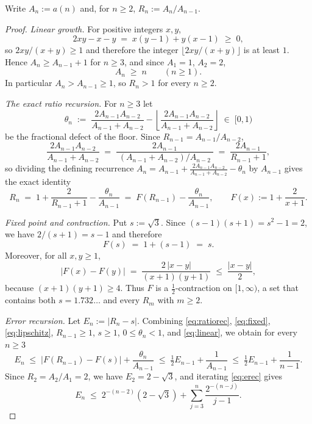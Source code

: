 \documentclass[11pt]{article}
\theoremstyle{plain}
\theoremstyle{definition}
\theoremstyle{remark}
\numberwithin{equation}{section}
\begin{document}
Write $A_n := a(n)$ and, for $n \ge 2$, $R_n := A_n/A_{n-1}$.

\begin{proof}
\emph{Linear growth.} For positive integers $x, y$,
\[
  2xy - x - y \;=\; x(y-1) + y(x-1) \;\ge\; 0,
\]
so $2xy/(x+y) \ge 1$ and therefore the integer $\lfloor 2xy/(x+y) \rfloor$ is at least $1$.
Hence $A_n \ge A_{n-1} + 1$ for $n \ge 3$, and since $A_1 = 1$, $A_2 = 2$,
\begin{equation}
  A_n \;\ge\; n \qquad (n \ge 1).
  \label{eq:linear}
\end{equation}
In particular $A_n > A_{n-1} \ge 1$, so $R_n > 1$ for every $n \ge 2$.

\emph{The exact ratio recursion.} For $n \ge 3$ let
\[
  \theta_n \;:=\; \frac{2A_{n-1}A_{n-2}}{A_{n-1}+A_{n-2}}
    - \left\lfloor \frac{2A_{n-1}A_{n-2}}{A_{n-1}+A_{n-2}} \right\rfloor \;\in\; [0,1)
\]
be the fractional defect of the floor. Since $R_{n-1} = A_{n-1}/A_{n-2}$,
\[
  \frac{2A_{n-1}A_{n-2}}{A_{n-1}+A_{n-2}}
  \;=\; \frac{2A_{n-1}}{\;(A_{n-1}+A_{n-2})/A_{n-2}\;}
  \;=\; \frac{2A_{n-1}}{R_{n-1}+1},
\]
so dividing the defining recurrence $A_n = A_{n-1} + \frac{2A_{n-1}A_{n-2}}{A_{n-1}+A_{n-2}} - \theta_n$
by $A_{n-1}$ gives the exact identity
\begin{equation}
  R_n \;=\; 1 + \frac{2}{R_{n-1}+1} - \frac{\theta_n}{A_{n-1}}
  \;=\; F(R_{n-1}) - \frac{\theta_n}{A_{n-1}},
  \qquad F(x) := 1 + \frac{2}{x+1}.
  \label{eq:ratiorec}
\end{equation}

\emph{Fixed point and contraction.} Put $s := \sqrt3$. Since $(s-1)(s+1) = s^2-1 = 2$, we have
$2/(s+1) = s-1$ and therefore
\begin{equation}
  F(s) \;=\; 1 + (s-1) \;=\; s.
  \label{eq:fixed}
\end{equation}
Moreover, for all $x, y \ge 1$,
\begin{equation}
  |F(x) - F(y)| \;=\; \frac{2\,|x-y|}{(x+1)(y+1)} \;\le\; \frac{|x-y|}{2},
  \label{eq:lipschitz}
\end{equation}
because $(x+1)(y+1) \ge 4$. Thus $F$ is a $\tfrac12$-contraction on $[1,\infty)$, a set that
contains both $s = 1.732\ldots$ and every $R_m$ with $m \ge 2$.

\emph{Error recursion.} Let $E_n := |R_n - s|$. Combining \eqref{eq:ratiorec},
\eqref{eq:fixed}, \eqref{eq:lipschitz}, $R_{n-1} \ge 1$, $s \ge 1$, $0 \le \theta_n < 1$, and
\eqref{eq:linear}, we obtain for every $n \ge 3$
\begin{equation}
  E_n \;\le\; |F(R_{n-1}) - F(s)| + \frac{\theta_n}{A_{n-1}}
  \;\le\; \tfrac12 E_{n-1} + \frac{1}{A_{n-1}}
  \;\le\; \tfrac12 E_{n-1} + \frac{1}{n-1}.
  \label{eq:erec}
\end{equation}
Since $R_2 = A_2/A_1 = 2$, we have $E_2 = 2 - \sqrt3$, and iterating \eqref{eq:erec} gives
\begin{equation}
  E_n \;\le\; 2^{-(n-2)}(2-\sqrt3) + \sum_{j=3}^{n} \frac{2^{-(n-j)}}{j-1}.
  \label{eq:iterated}
\end{equation}


\end{proof}
\end{document}

